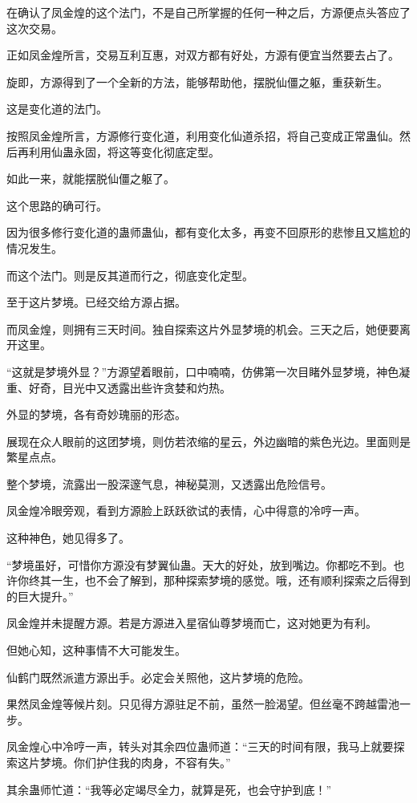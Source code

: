 \begin{this_body}
在确认了凤金煌的这个法门，不是自己所掌握的任何一种之后，方源便点头答应了这次交易。

正如凤金煌所言，交易互利互惠，对双方都有好处，方源有便宜当然要去占了。

旋即，方源得到了一个全新的方法，能够帮助他，摆脱仙僵之躯，重获新生。

这是变化道的法门。

按照凤金煌所言，方源修行变化道，利用变化仙道杀招，将自己变成正常蛊仙。然后再利用仙蛊永固，将这等变化彻底定型。

如此一来，就能摆脱仙僵之躯了。

这个思路的确可行。

因为很多修行变化道的蛊师蛊仙，都有变化太多，再变不回原形的悲惨且又尴尬的情况发生。

而这个法门。则是反其道而行之，彻底变化定型。

至于这片梦境。已经交给方源占据。

而凤金煌，则拥有三天时间。独自探索这片外显梦境的机会。三天之后，她便要离开这里。

“这就是梦境外显？”方源望着眼前，口中喃喃，仿佛第一次目睹外显梦境，神色凝重、好奇，目光中又透露出些许贪婪和灼热。

外显的梦境，各有奇妙瑰丽的形态。

展现在众人眼前的这团梦境，则仿若浓缩的星云，外边幽暗的紫色光边。里面则是繁星点点。

整个梦境，流露出一股深邃气息，神秘莫测，又透露出危险信号。

凤金煌冷眼旁观，看到方源脸上跃跃欲试的表情，心中得意的冷哼一声。

这种神色，她见得多了。

“梦境虽好，可惜你方源没有梦翼仙蛊。天大的好处，放到嘴边。你都吃不到。也许你终其一生，也不会了解到，那种探索梦境的感觉。哦，还有顺利探索之后得到的巨大提升。”

凤金煌并未提醒方源。若是方源进入星宿仙尊梦境而亡，这对她更为有利。

但她心知，这种事情不大可能发生。

仙鹤门既然派遣方源出手。必定会关照他，这片梦境的危险。

果然凤金煌等候片刻。只见得方源驻足不前，虽然一脸渴望。但丝毫不跨越雷池一步。

凤金煌心中冷哼一声，转头对其余四位蛊师道：“三天的时间有限，我马上就要探索这片梦境。你们护住我的肉身，不容有失。”

其余蛊师忙道：“我等必定竭尽全力，就算是死，也会守护到底！”


\end{this_body}
